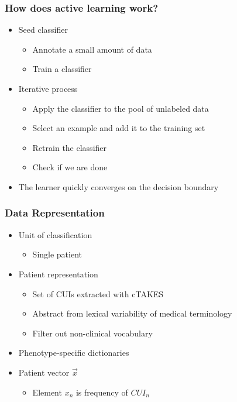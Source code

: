 \documentclass{beamer}
\begin{document}
\begin{frame}
\frametitle{How does active learning work?}
\begin{itemize}
\item Seed classifier
\begin{itemize}
\item Annotate a small amount of data
\item Train a classifier
\end{itemize}
\item Iterative process
\begin{itemize}
\item Apply the classifier to the pool of unlabeled data
\item Select an example and add it to the training set
\item Retrain the classifier
\item Check if we are done
\end{itemize}
\item The learner quickly converges on the decision boundary
\end{itemize}
\end{frame}

\begin{frame}
\frametitle{Data Representation}
\begin{itemize}
\item Unit of classification
\begin{itemize}
\item Single patient
\end{itemize}
\item Patient representation
\begin{itemize}
\item Set of CUIs extracted with cTAKES
\item Abstract from lexical variability of medical terminology
\item Filter out non-clinical vocabulary
\end{itemize}
\item Phenotype-specific dictionaries
\item Patient vector $\vec{x}$ 
\begin{itemize}
\item Element $x_n$ is frequency of $CUI_n$
\end{itemize}
\end{itemize}
\end{frame}
\end{document}
